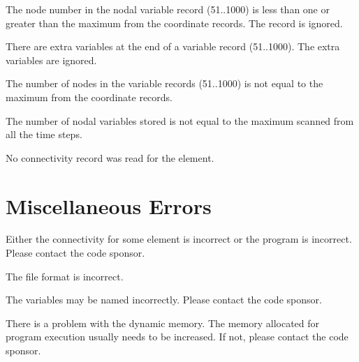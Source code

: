 {
The node number in the nodal variable record (51..1000) is less than one
or greater than the maximum from the coordinate records. The record is
ignored.
}

{
There are extra variables at the end of a variable record (51..1000).
The extra variables are ignored.
}

{
The number of nodes in the variable records (51..1000) is not equal to
the maximum from the coordinate records.
}

{
The number of nodal variables stored is not equal to the maximum scanned
from all the time steps.
}

{
No connectivity record was read for the element.
}

\section{Miscellaneous Errors} \label{output:miscerr}

{
Either the connectivity for some element is incorrect or the program is
incorrect. Please contact the code sponsor.
}

{
The \caps{\PROGRAM} file format is incorrect.
}

{
The variables may be named incorrectly. Please contact the code sponsor.
}

{
There is a problem with the dynamic memory. The memory allocated for
program execution usually needs to be increased. If not, please contact
the code sponsor.
}

